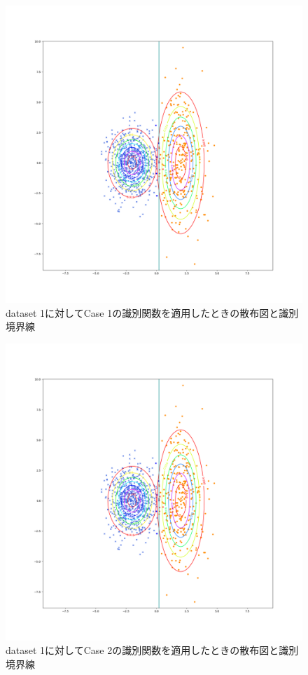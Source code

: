 \documentclass[class=jsarticle, crop=false, dvipdfmx, fleqn]{standalone}
\begin{document}
\begin{figure}
    \centering
    \includegraphics[clip, width=\linewidth]{../figures/result_assignment1_dataset1_case1.png}
    \caption{dataset 1に対してCase 1の識別関数を適用したときの散布図と識別境界線}
    \label{fig:result_dataset1_case1}
\end{figure}

\begin{figure}
    \centering
    \includegraphics[clip, width=\linewidth]{../figures/result_assignment1_dataset1_case2.png}
    \caption{dataset 1に対してCase 2の識別関数を適用したときの散布図と識別境界線}
    \label{fig:result_dataset1_case2}
\end{figure}
\end{document}
